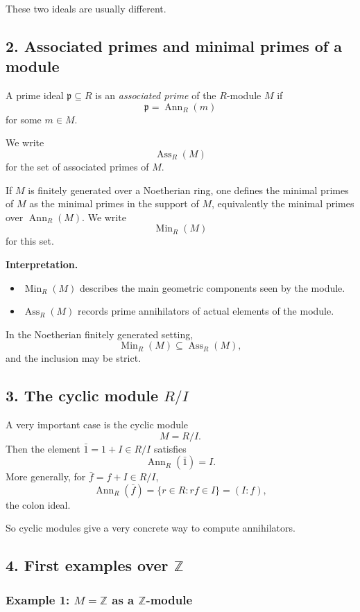 \documentclass[12pt,a4paper,oneside]{report}
\DeclareMathOperator{\Ass}{Ass}
\DeclareMathOperator{\Ann}{Ann}
\DeclareMathOperator{\Min}{Min}
\theoremstyle{notespace}
\begin{document}
	These two ideals are usually different.
	
	\subsection{2. Associated primes and minimal primes of a module}
	
	A prime ideal \(\mathfrak p\subseteq R\) is an \emph{associated prime} of the \(R\)-module \(M\) if
	\[
	\mathfrak p=\Ann_R(m)
	\]
	for some \(m\in M\).
	
	We write
	\[
	\Ass_R(M)
	\]
	for the set of associated primes of \(M\).
	
	If \(M\) is finitely generated over a Noetherian ring, one defines the minimal primes of \(M\) as the minimal primes in the support of \(M\), equivalently the minimal primes over \(\Ann_R(M)\). We write
	\[
	\Min_R(M)
	\]
	for this set.
	
	\medskip
	
	\noindent
	\textbf{Interpretation.}
	\begin{itemize}
		\item \(\Min_R(M)\) describes the main geometric components seen by the module.
		\item \(\Ass_R(M)\) records prime annihilators of actual elements of the module.
	\end{itemize}
	
	In the Noetherian finitely generated setting,
	\[
	\Min_R(M)\subseteq \Ass_R(M),
	\]
	and the inclusion may be strict.
	
	\subsection{3. The cyclic module \(R/I\)}
	
	A very important case is the cyclic module
	\[
	M=R/I.
	\]
	Then the element \(\bar 1=1+I\in R/I\) satisfies
	\[
	\Ann_R(\bar 1)=I.
	\]
	More generally, for \(\bar f=f+I\in R/I\),
	\[
	\Ann_R(\bar f)=\{r\in R:rf\in I\}=(I:f),
	\]
	the colon ideal.
	
	So cyclic modules give a very concrete way to compute annihilators.
	
	\subsection{4. First examples over \(\mathbb Z\)}
	
	\subsubsection{Example 1: \(M=\mathbb Z\) as a \(\mathbb Z\)-module}
	
\end{document}
